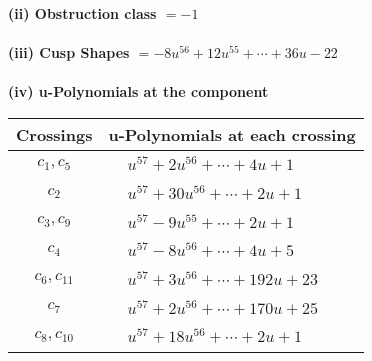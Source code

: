 \documentclass[1p]{elsarticle_modified}
\theoremstyle{definition}
\begin{document}
\flushleft \textbf{(ii) Obstruction class $= -1$}\\~\\
\flushleft \textbf{(iii) Cusp Shapes $= -8 u^{56}+12 u^{55}+\cdots+36 u-22$}\\~\\
\newpage\renewcommand{\arraystretch}{1}
\flushleft \textbf{(iv) u-Polynomials at the component}\newline \\
\begin{tabular}{m{50pt}|m{274pt}}
Crossings & \hspace{64pt}u-Polynomials at each crossing \\
\hline $$\begin{aligned}c_{1},c_{5}\end{aligned}$$&$\begin{aligned}
&u^{57}+2 u^{56}+\cdots+4 u+1
\end{aligned}$\\
\hline $$\begin{aligned}c_{2}\end{aligned}$$&$\begin{aligned}
&u^{57}+30 u^{56}+\cdots+2 u+1
\end{aligned}$\\
\hline $$\begin{aligned}c_{3},c_{9}\end{aligned}$$&$\begin{aligned}
&u^{57}-9 u^{55}+\cdots+2 u+1
\end{aligned}$\\
\hline $$\begin{aligned}c_{4}\end{aligned}$$&$\begin{aligned}
&u^{57}-8 u^{56}+\cdots+4 u+5
\end{aligned}$\\
\hline $$\begin{aligned}c_{6},c_{11}\end{aligned}$$&$\begin{aligned}
&u^{57}+3 u^{56}+\cdots+192 u+23
\end{aligned}$\\
\hline $$\begin{aligned}c_{7}\end{aligned}$$&$\begin{aligned}
&u^{57}+2 u^{56}+\cdots+170 u+25
\end{aligned}$\\
\hline $$\begin{aligned}c_{8},c_{10}\end{aligned}$$&$\begin{aligned}
&u^{57}+18 u^{56}+\cdots+2 u+1
\end{aligned}$\\
\hline
\end{tabular}\\~\\
\end{document}
